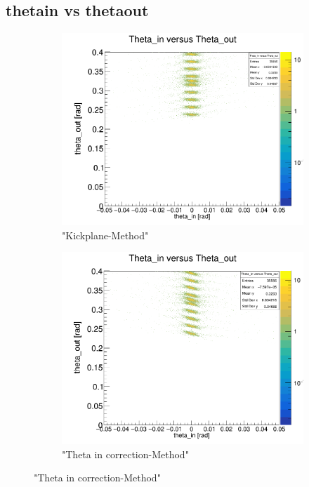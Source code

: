\documentclass[12pt, letterpaper]{article}
\begin{document}
\subsection{theta\textunderscore in vs theta\textunderscore out}
\begin{figure}[!htbp]
\begin{subfigure}{.5\textwidth}
  \centering
  \includegraphics[width=.9\linewidth]{plot_imgs/theta_in_theta_out_get_centr.png}  
  \caption{"Kickplane-Method"}
  \label{fig:sub-first}
\end{subfigure}
\begin{subfigure}{.5\textwidth}
  \centering
  \includegraphics[width=.9\linewidth]{plot_imgs/theta_in_theta_out_corr.png} 
  \caption{"Theta \textunderscore in correction-Method"}

\end{subfigure}
\end{figure}
\end{document}
